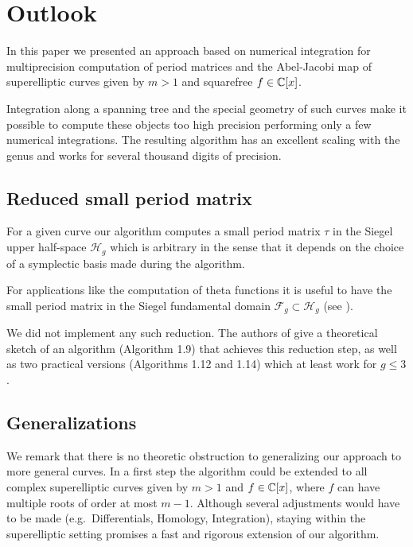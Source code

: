 \documentclass[main.tex]{subfiles}
\begin{document}
  \newpage

  \section{Outlook}\label{sec:outlook}

  In this paper we presented an approach based on numerical integration for
  multiprecision computation of period matrices and the Abel-Jacobi map of
  superelliptic curves given by $m > 1$ and squarefree $f \in \mathbb{C}[x]$.
 
  Integration along a spanning tree and the special geometry of such curves
  make it possible to compute these objects too high precision performing only
  a few numerical integrations. The resulting algorithm has an excellent
  scaling with the genus and works for several thousand digits of precision.

  \subsection{Reduced small period matrix}

   For a given curve our algorithm computes a small period matrix
   $\tau$ in the Siegel upper half-space $\mathcal{H}_g$ which is arbitrary
   in the sense that it depends on the choice of a symplectic basis made
   during the algorithm.
   
   For applications like the computation of theta functions it is useful to
   have the small period matrix in the Siegel fundamental domain $\mathcal{F}_g \subset
   \mathcal{H}_g$ (see \cite[\S 1.3]{PlaneQuarticsCM}).
  
   We did not implement any such reduction.
   The authors of \cite{PlaneQuarticsCM} give a theoretical sketch of
   an algorithm (Algorithm 1.9) that achieves this reduction step, as well as
   two practical versions (Algorithms 1.12 and 1.14) which at least work for $g
   \le 3$.
  
  \subsection{Generalizations}
  
  We remark that there is no theoretic obstruction to generalizing our
  approach to more general curves. In a first step the algorithm could be
  extended to all complex superelliptic curves given by $m > 1$ and $f \in
  \mathbb{C}[x]$, where $f$ can have multiple roots of order at most $m-1$.
  Although several adjustments would have to be made (e.g.\ Differentials,
  Homology, Integration), staying within the superelliptic setting promises
  a fast and rigorous extension of our algorithm. 
  
\end{document}
